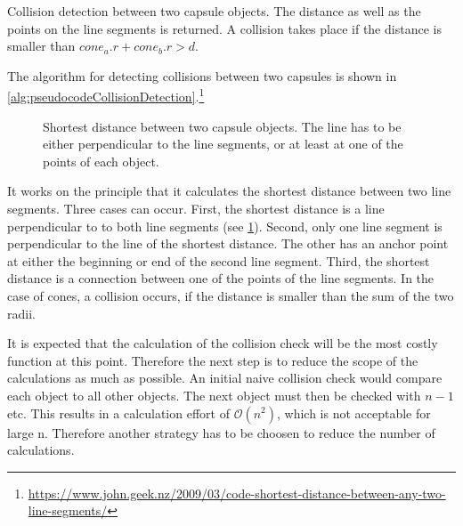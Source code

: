 \begin{lstfloat}[!t]
\caption{Collision detection between two capsule objects. The distance as well as the points on the line segments is returned. A collision takes place if the distance is smaller than $\mathit{cone_a.r}+\mathit{cone_b.r} > d$.}
\label{alg:pseudocodeCollisionDetection}
\end{lstfloat}
% 
The algorithm for detecting collisions between two capsules is shown in \cref{alg:pseudocodeCollisionDetection}.\footnote{\href{https://www.john.geek.nz/2009/03/code-shortest-distance-between-any-two-line-segments/}{https://www.john.geek.nz/2009/03/code-shortest-distance-between-any-two-line-segments/}}
%
\begin{figure}[!t]
    \centering
    \def\tikzheight{0.5\textwidth}
	\caption[Shortest distance of capsule objects]{Shortest distance between two capsule objects. The line has to be either perpendicular to the line segments, or at least at one of the points of each object.}
	\label{fig:shortDist}
\end{figure}
%
It works on the principle that it calculates the shortest distance between two line segments.
Three cases can occur.
First, the shortest distance is a line perpendicular to to both line segments (see \cref{fig:shortDist}).
Second, only one line segment is perpendicular to the line of the shortest distance.
The other has an anchor point at either the beginning or end of the second line segment.
Third, the shortest distance is a connection between one of the points of the line segments.
In the case of cones, a collision occurs, if the distance is smaller than the sum of the two radii.
\par
% 
It is expected that the calculation of the collision check will be the most costly function at this point.
Therefore the next step is to reduce the scope of the calculations as much as possible.
An initial naive collision check would compare each object to all other objects.
The next object must then be checked with $n-1$ etc.
This results in a calculation effort of $\mathcal{O}(n^{2})$, which is not acceptable for large n.
Therefore another strategy has to be choosen to reduce the number of calculations.
%
% 
% 

